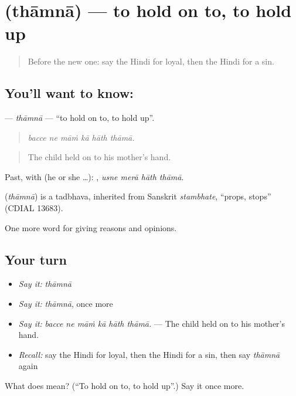 \section[\texorpdfstring{\hi{थामना} (thāmnā)}{थामना (thāmnā)}]{ (thāmnā) — to hold on to, to hold up}

\label{lesson:HI-C372-thamna}



\begin{quote}
Before the new one: say the Hindi for loyal, then the Hindi for a sin.
\end{quote}

\subsection*{You'll want to know: }
\textbf{} — \emph{thāmnā} — \textquotedblleft{}to hold on to, to hold up\textquotedblright{}.

\begin{quote}
     
\end{quote}

\begin{quote}
\emph{bacce ne māṁ kā hāth thāmā.}
\end{quote}

\begin{quote}
The child held on to his mother's hand.
\end{quote}

Past, with  (he or she …):    , \emph{usne merā hāth thāmā}.

\begin{cousinweb}
\textbf{} (\emph{thāmnā}) is a tadbhava, inherited from Sanskrit \emph{stambhate}, \textquotedblleft{}props, stops\textquotedblright{} (CDIAL 13683).
\end{cousinweb}

\begin{grammarlens}[title={What you've built}]
One more word for giving reasons and opinions.
\end{grammarlens}

\subsection*{Your turn}
\begin{itemize}
\raggedright
  \item \emph{Say it:} \emph{thāmnā}
  \item \emph{Say it:} \emph{thāmnā}, once more
  \item \emph{Say it:} \emph{bacce ne māṁ kā hāth thāmā.} — The child held on to his mother's hand.
  \item \emph{Recall:} say the Hindi for loyal, then the Hindi for a sin, then say \emph{thāmnā} again
\end{itemize}

\begin{tcolorbox}[breakable,colback=teal!4,colframe=teal!35!black,title={Before you move on}]
What does  mean? (\textquotedblleft{}To hold on to, to hold up\textquotedblright{}.) Say it once more.
\end{tcolorbox}
